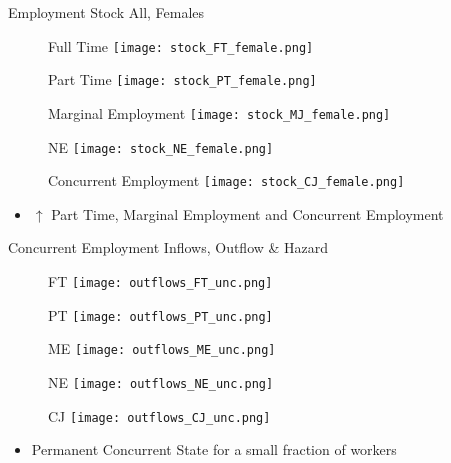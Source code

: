 \documentclass[hyperref={bookmarks=false}]{beamer}
\let\oldcite=\cite
\renewcommand{\cite}[1]{\textcolor[rgb]{.0,.2,.7}{\oldcite{#1}}}
\begin{document}
\begin{appendix}
\begin{frame}{Employment Stock All, Females}
\begin{figure}[!t]
\centering
\begin{minipage}[b]{0.4\textwidth}{Full Time}
\centering
\texttt{[image: stock\_FT\_female.png]}
\end{minipage}
\begin{minipage}[b]{0.4\textwidth}{Part Time}
\centering
\texttt{[image: stock\_PT\_female.png]}
\end{minipage}
\begin{minipage}[b]{0.3\textwidth}{Marginal Employment}
\centering
\texttt{[image: stock\_MJ\_female.png]}
\end{minipage}
\begin{minipage}[b]{0.3\textwidth}{NE}
	\centering
	\texttt{[image: stock\_NE\_female.png]}
\end{minipage}
\begin{minipage}[b]{0.3\textwidth}{Concurrent Employment}
\centering
\texttt{[image: stock\_CJ\_female.png]}
\end{minipage}
\end{figure}
\begin{itemize}
\setlength{\itemsep}{0.7 cm}
\item $\uparrow$ Part Time, Marginal Employment and Concurrent Employment \cite{CarriTuRo15} 
\end{itemize}
\end{frame}

\begin{frame}{Concurrent Employment Inflows, Outflow \& Hazard}
\begin{figure}[!t]
\centering
\begin{minipage}[b]{0.3\textwidth}{FT}
\centering
\texttt{[image: outflows\_FT\_unc.png]}
\end{minipage}
\begin{minipage}[b]{0.3\textwidth}{PT}
	\centering
	\texttt{[image: outflows\_PT\_unc.png]}
\end{minipage}
\begin{minipage}[b]{0.3\textwidth}{ME}
	\centering
	\texttt{[image: outflows\_ME\_unc.png]}
\end{minipage}
\begin{minipage}[b]{0.3\textwidth}{NE}
	\centering
	\texttt{[image: outflows\_NE\_unc.png]}
\end{minipage}
\begin{minipage}[b]{0.3\textwidth}{CJ}
	\centering
	\texttt{[image: outflows\_CJ\_unc.png]}
\end{minipage}
\end{figure}
\begin{itemize}
\setlength{\itemsep}{0.7 cm}
\item Permanent Concurrent State for a small fraction of workers \cite{CarriTuRo15}
\end{itemize}
\end{frame}


\end{appendix}
\end{document}
